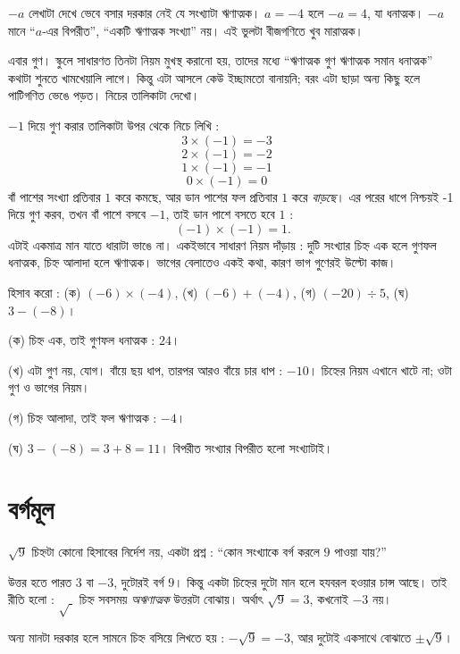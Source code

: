 \documentclass[11pt]{article}
\begin{document}
\begin{remark}
$-a$ লেখাটা দেখে ভেবে বসার দরকার নেই যে সংখ্যাটা ঋণাত্মক। $a = -4$ হলে
$-a = 4$, যা ধনাত্মক। $-a$ মানে ``$a$-এর বিপরীত'', ``একটি ঋণাত্মক সংখ্যা'' নয়।
এই ভুলটা বীজগণিতে খুব মারাত্মক।
\end{remark}

\noindent
এবার গুণ। স্কুলে সাধারণত তিনটা নিয়ম মুখস্থ করানো হয়, তাদের মধ্যে ``ঋণাত্মক গুণ ঋণাত্মক
সমান ধনাত্মক'' কথাটা শুনতে খামখেয়ালি লাগে। কিন্তু এটা আসলে কেউ ইচ্ছামতো বানায়নি; বরং এটা ছাড়া অন্য কিছু
হলে পাটিগণিত ভেঙে পড়ত। নিচের তালিকাটা দেখো।

\begin{idea}[চিহ্নের নিয়ম আবিষ্কার নয়, বাধ্যবাধকতা]
$-1$ দিয়ে গুণ করার তালিকাটা উপর থেকে নিচে লিখি :
\[
  3 \times (-1) = -3 \quad
\]
\[
  2 \times (-1) = -2 \quad
\]
\[
  1 \times (-1) = -1  \quad
\]
\[
  0 \times (-1) = 0 \quad
\]
বাঁ পাশের সংখ্যা প্রতিবার $1$ করে কমছে, আর ডান পাশের ফল প্রতিবার $1$ করে
\emph{বাড়ছে}। এর পরের ধাপে নিশ্চয়ই -1 দিয়ে গুণ করব, তখন  বাঁ পাশে বসবে $-1$, তাই ডান পাশে বসতে হবে $1$ :
\[
  (-1) \times (-1) = 1 .
\]
এটাই একমাত্র মান যাতে ধারাটা ভাঙে না। একইভাবে সাধারণ নিয়ম দাঁড়ায় : দুটি
সংখ্যার চিহ্ন এক হলে গুণফল ধনাত্মক, চিহ্ন আলাদা হলে ঋণাত্মক। ভাগের বেলাতেও
একই কথা, কারণ ভাগ গুণেরই উল্টো কাজ।
\end{idea}

\begin{example}
হিসাব করো : (ক) $(-6) \times (-4)$, \; (খ) $(-6) + (-4)$, \;
(গ) $(-20) \div 5$, \; (ঘ) $3 - (-8)$।
\end{example}

\begin{solbox}
(ক) চিহ্ন এক, তাই গুণফল ধনাত্মক : $24$।

(খ) এটা গুণ নয়, যোগ। বাঁয়ে ছয় ধাপ, তারপর আরও বাঁয়ে চার ধাপ : $-10$।
চিহ্নের নিয়ম এখানে খাটে না; ওটা গুণ ও ভাগের নিয়ম।

(গ) চিহ্ন আলাদা, তাই ফল ঋণাত্মক : $-4$।

(ঘ) $3 - (-8) = 3 + 8 = 11$। বিপরীত সংখ্যার বিপরীত হলো সংখ্যাটাই।
\end{solbox}

\section{বর্গমূল}

\begin{idea}[বর্গমূল একটি প্রশ্ন]
$\sqrt{9}$ চিহ্নটা কোনো হিসাবের নির্দেশ নয়, একটা প্রশ্ন : ``কোন সংখ্যাকে বর্গ
করলে $9$ পাওয়া যায়?''

উত্তর হতে পারত $3$ বা $-3$, দুটোরই বর্গ $9$। কিন্তু একটা চিহ্নের দুটো মান হলে
হযবরল হওয়ার চান্স আছে। তাই রীতি হলো : $\sqrt{\;}$ চিহ্ন সবসময় \emph{অঋণাত্মক}
উত্তরটা বোঝায়। অর্থাৎ $\sqrt{9} = 3$, কখনোই $-3$ নয়।

অন্য মানটা দরকার হলে সামনে চিহ্ন বসিয়ে লিখতে হয় : $-\sqrt{9} = -3$, আর দুটোই
একসাথে বোঝাতে $\pm\sqrt{9}$।
\end{idea}
\end{document}
